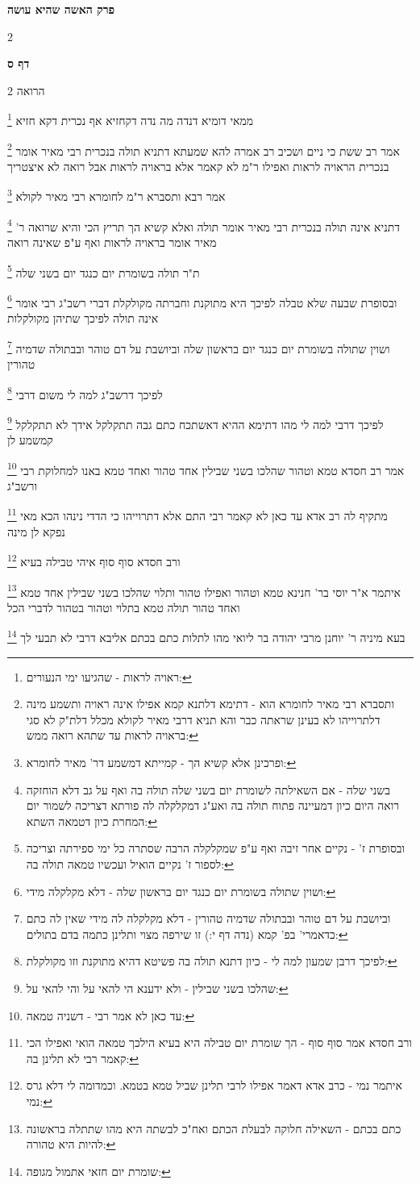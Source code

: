\documentclass[12pt, openany]{book}
\newcommand{\sethebfont}{
\fontsize{10.5pt}{21.0pt} \selectfont
}
\newcommand{\twocol}[1]{
	{\sethebfont \begin{multicols}{2}
			#1
	\end{multicols}}	
}
\newcommand{\chapname}{}
\newcommand{\sectname}{}
\newcommand{\newchap}[1]{
	\addcontentsline{toc}{chapter}{#1}
	\renewcommand{\chapname}{#1}
		\begin{center}
			\textbf{%
\fontsize{16pt}{16pt}\selectfont
				#1}
		\end{center}
}
\newcommand{\newsection}[1]{
	\renewcommand{\sectname}{#1}	
	\vspace{-\baselineskip}
	\begin{center}
		\textbf{%
\fontsize{16pt}{16pt}\selectfont
			#1}
	\end{center}
	\vspace{-\baselineskip}
	\nopagebreak
}
\newcommand{\footnotecomment}[1]{
	\renewcommand\thefootnote{}
	\footnote{#1}}
\newcommand{\commenta}[1]{\footnotecomment{#1}}
\begin{document}
\newchap{פרק  האשה שהיא עושה}
\twocol{\clearpage}

\newsection{דף ס}
\twocol{הרואה 
\commenta{ראויה לראות - שהגיעו ימי הנעורים:}
ממאי דומיא דנדה מה נדה דקחזיא אף נכרית דקא חזיא 
\commenta{ותסברא רבי מאיר לחומרא הוא - דתימא דלתנא קמא אפילו אינה ראויה ותשמע מינה דלתרוייהו לא בעינן שראתה כבר והא תניא דרבי מאיר לקולא מכלל דלת"ק לא סגי בראויה לראות עד שתהא רואה ממש:}
אמר רב ששת כי ניים ושכיב רב אמרה להא שמעתא דתניא תולה בנכרית רבי מאיר אומר בנכרית הראויה לראות ואפילו ר"מ לא קאמר אלא בראויה לראות אבל רואה לא איצטריך 
\commenta{ופרכינן אלא קשיא הך - קמייתא דמשמע דר' מאיר לחומרא:
}
אמר רבא ותסברא ר"מ לחומרא רבי מאיר לקולא 
\commenta{בשני שלה - אם השאילתה לשומרת יום בשני שלה תולה בה ואף על גב דלא הוחזקה רואה היום כיון דמעיינה פתוח תולה בה ואע"ג דמקלקלה לה פורתא דצריכה לשמור יום המחרת כיון דטמאה השתא:}
דתניא אינה תולה בנכרית רבי מאיר אומר תולה ואלא קשיא הך תריץ הכי והיא שרואה ר' מאיר אומר בראויה לראות ואף ע"פ שאינה רואה 
\commenta{ובסופרת ז' - נקיים אחר זיבה ואף ע"פ שמקלקלה הרבה שסתרה כל ימי ספירתה וצריכה לספור ז' נקיים הואיל ועכשיו טמאה תולה בה:}
ת"ר תולה בשומרת יום כנגד יום בשני שלה
\commenta{ושוין שתולה בשומרת יום כנגד יום בראשון שלה - דלא מקלקלה מידי:}
ובסופרת שבעה שלא טבלה לפיכך היא מתוקנת וחברתה מקולקלת דברי רשב"ג רבי אומר אינה תולה לפיכך שתיהן מקולקלות 
\commenta{וביושבת על דם טוהר ובבתולה שדמיה טהורין - דלא מקלקלה לה מידי שאין לה כתם כדאמרי' בפ' קמא (נדה דף י:) זו שירפה מצוי ותלינן כתמה בדם בתולים:}
ושוין שתולה בשומרת יום כנגד יום בראשון שלה
וביושבת על דם טוהר ובבתולה שדמיה טהורין 
\commenta{לפיכך דרבן שמעון למה לי - כיון דתנא תולה בה פשיטא דהיא מתוקנת וזו מקולקלת:}
לפיכך דרשב"ג למה לי משום דרבי 
\commenta{שהלכו בשני שבילין - ולא ידענא הי להאי על והי להאי על:}
לפיכך דרבי למה לי מהו דתימא ההיא דאשתכח כתם גבה תתקלקל אידך לא תתקלקל קמשמע לן 
\commenta{עד כאן לא אמר רבי - דשניה טמאה:}
אמר רב חסדא טמא וטהור שהלכו בשני שבילין אחד טהור ואחד טמא באנו למחלוקת רבי ורשב"ג 
\commenta{ורב חסדא אמר סוף סוף - הך שומרת יום טבילה היא בעיא הילכך טמאה הואי ואפילו הכי קאמר רבי לא תלינן בה:}
מתקיף לה רב אדא עד כאן לא קאמר רבי התם אלא דתרוייהו כי הדדי נינהו הכא מאי נפקא לן מינה 
\commenta{איתמר נמי - כרב אדא דאמר אפילו לרבי תלינן שביל טמא בטמא. וכמדומה לי דלא גרס נמי:}
ורב חסדא סוף סוף איהי טבילה בעיא 
\commenta{כתם בכתם - השאילה חלוקה לבעלת הכתם ואח"כ לבשתה היא מהו שתתלה בראשונה להיות היא טהורה:}
איתמר א"ר יוסי בר' חנינא טמא וטהור ואפילו טהור ותלוי שהלכו בשני שבילין אחד טמא ואחד טהור תולה טמא בתלוי וטהור בטהור לדברי הכל 
\commenta{שומרת יום חזאי אתמול מגופה:}
בעא מיניה ר' יוחנן מרבי יהודה בר ליואי מהו לתלות כתם בכתם אליבא דרבי לא תבעי לך
}
\end{document}
